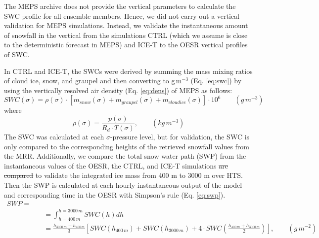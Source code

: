 \documentclass{ametsocV5}
\providecommand{\DIFdel}[1]{{\protect\color{red}\sout{#1}}}                      %
\providecommand{\DIFaddbegin}{} %
\providecommand{\DIFaddend}{} %
\providecommand{\DIFdelbegin}{} %
\providecommand{\DIFdelend}{} %
\newcommand{\DIFscaledelfig}{0.5}
\newlength{\DIFdelgraphicswidth} %
\newlength{\DIFdelgraphicsheight} %
\newcommand{\DIFaddincludegraphics}[2][]{{\color{blue}\fbox{\DIFOincludegraphics[#1]{#2}}}} %
\newcommand{\DIFdelincludegraphics}[2][]{%
\sbox{\DIFdelgraphicsbox}{\DIFOincludegraphics[#1]{#2}}%
\settoboxwidth{\DIFdelgraphicswidth}{\DIFdelgraphicsbox} %
\settoboxtotalheight{\DIFdelgraphicsheight}{\DIFdelgraphicsbox} %
\scalebox{\DIFscaledelfig}{%
\parbox[b]{\DIFdelgraphicswidth}{\usebox{\DIFdelgraphicsbox}\\[-\baselineskip] \rule{\DIFdelgraphicswidth}{0em}}\llap{\resizebox{\DIFdelgraphicswidth}{\DIFdelgraphicsheight}{%
\setlength{\unitlength}{\DIFdelgraphicswidth}%
\begin{picture}(1,1)%
\thicklines\linethickness{2pt} %
{\color[rgb]{1,0,0}\put(0,0){\framebox(1,1){}}}%
{\color[rgb]{1,0,0}\put(0,0){\line( 1,1){1}}}%
{\color[rgb]{1,0,0}\put(0,1){\line(1,-1){1}}}%
\end{picture}%
}\hspace*{3pt}}} %
} %
\DeclareRobustCommand{\DIFaddbegin}{\DIFOaddbegin \let\includegraphics\DIFaddincludegraphics} %
\DeclareRobustCommand{\DIFaddend}{\DIFOaddend \let\includegraphics\DIFOincludegraphics} %
\DeclareRobustCommand{\DIFdelbegin}{\DIFOdelbegin \let\includegraphics\DIFdelincludegraphics} %
\DeclareRobustCommand{\DIFdelend}{\DIFOaddend \let\includegraphics\DIFOincludegraphics} %
\begin{document}
		
		The MEPS archive does not provide the vertical parameters to calculate the SWC profile for all ensemble members. Hence, we did not carry out a vertical validation for MEPS simulations. Instead, we validate the instantaneous amount of snowfall in the vertical from the simulations CTRL (which we assume is close to the deterministic forecast in MEPS) and ICE-T to the OESR vertical profiles of SWC.

		In CTRL and ICE-T, the SWCs were derived by summing the mass mixing ratios of cloud ice, snow, and graupel and then converting to g\,m$^{-3}$ (Eq. \ref{eq:swc}) by using the vertically resolved air density (Eq. \ref{eq:dens}) of MEPS as follows:
		\begin{equation}
			SWC(\sigma) = \rho(\sigma) \cdot [m_{snow}(\sigma) + m_{graupel}(\sigma) + m_{cloud ice}(\sigma)] \cdot 10^6 \qquad (g\,m^{-3})
			\label{eq:swc}
		\end{equation}
		where
		\begin{equation}
			\rho(\sigma) = \frac{p(\sigma)}{R_d \cdot T(\sigma)}, \qquad (kg\,m^{-3})
			\label{eq:dens}
		\end{equation}
		The SWC was calculated at each $\sigma$-pressure level, but for validation, the SWC is only compared to the corresponding heights of the retrieved snowfall values from the MRR. Additionally, we compare the total snow water path (SWP) from the instantaneous values of the OESR, the CTRL, and ICE-T simulations \DIFdelbegin \DIFdel{are compared }\DIFdelend to validate the integrated ice mass from 400 m to 3000 m over HTS. Then the SWP is calculated at each hourly instantaneous output of the model and corresponding time in the OESR with Simpson's rule (Eq. \ref{eq:swp}).
		\begin{equation}
		\DIFdelbegin %
\DIFdelend \DIFaddbegin \begin{split}
		SWP =\\
		&\quad = \int_{h = 400\,m}^{h = 3000\,m} SWC(h) dh  \\
		&\quad = \frac{h_{3000\,m} - h_{400\,m}}{3} \left[ SWC(h_{400\,m}) + SWC(h_{3000\,m}) + 4 \cdot SWC \left( \frac{h_{400\,m} + h_{3000\,m}}{2}\right) \right], \qquad (g\,m^{-2})
		\end{split}\DIFaddend 
		\label{eq:swp}
		\end{equation}
\end{document}
